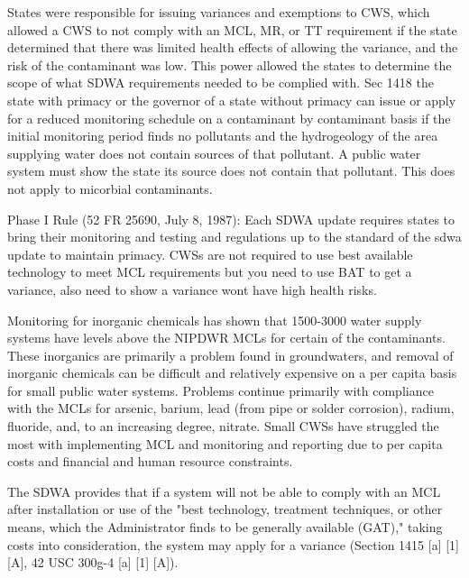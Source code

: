 \documentclass{article}
\begin{document}
States were responsible for issuing variances and exemptions to CWS, which allowed a CWS to not comply with an MCL, MR, or TT requirement if the state determined that there was limited health effects of allowing the variance, and the risk of the contaminant was low. This power allowed the states to determine the scope of what SDWA requirements needed to be complied with. Sec 1418 the state with primacy or the governor of a state without primacy can issue or apply for a reduced monitoring schedule on a contaminant by contaminant basis if the initial monitoring period finds no pollutants and the hydrogeology of the area supplying water does not contain sources of that pollutant. A public water system must show the state its source does not contain that pollutant. This does not apply to micorbial contaminants.

Phase I Rule (52 FR 25690, July 8, 1987): Each SDWA update requires states to bring their monitoring and testing and regulations up to the standard of the sdwa update to maintain primacy. CWSs are not required to use best available technology to meet MCL requirements but you need to use BAT to get a variance, also need to show a variance wont have high health risks.

Monitoring for inorganic chemicals
has shown that 1500-3000 water supply
systems have levels above the NIPDWR
MCLs for certain of the contaminants.
These inorganics are primarily a problem
found in groundwaters, and removal of
inorganic chemicals can be difficult and
relatively expensive on a per capita
basis for small public water systems.
Problems continue primarily with compliance with the MCLs for arsenic,
barium, lead (from pipe or solder corrosion), radium, fluoride, and, to an increasing degree, nitrate. Small CWSs have struggled the most with implementing MCL and monitoring and reporting due to per capita costs and financial and human resource constraints.

The SDWA provides that if a system
will not be able to comply with an MCL after installation or use of the "best
technology, treatment techniques, or
other means, which the Administrator
finds to be generally available (GAT),"
taking costs into consideration, the system may apply for a variance (Section
1415 [a] [1] [A], 42 USC 300g-4 [a] [1] [A]).
\end{document}
